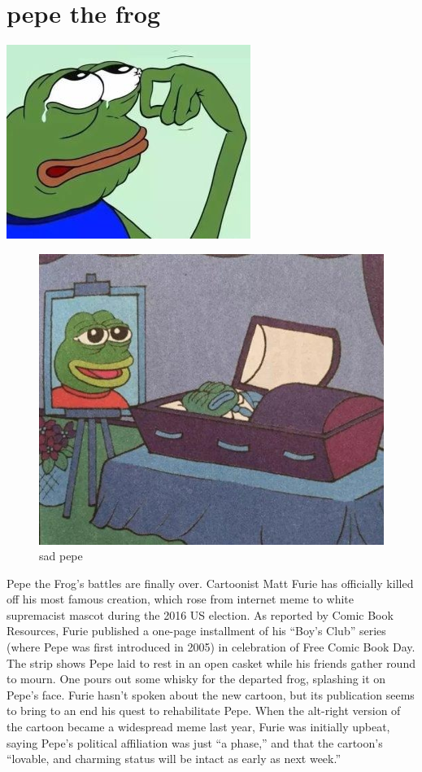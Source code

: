 
\section{pepe the frog}
\includegraphics [width=.9  \textwidth] {image/frog.jpg}
\begin{figure}
\begin{center}
\includegraphics  [width=0.5  \textwidth] {image/frog2.jpg} %
\end{center}
\caption{sad pepe}
\label{figure zzzz}
\end{figure}
Pepe the Frog’s battles are finally over. Cartoonist Matt Furie has officially killed off his most famous creation, which rose from internet meme to white supremacist mascot during the 2016 US election. As reported by Comic Book Resources, Furie published a one-page installment of his “Boy’s Club” series (where Pepe was first introduced in 2005) in celebration of Free Comic Book Day. The strip shows Pepe laid to rest in an open casket while his friends gather round to mourn. One pours out some whisky for the departed frog, splashing it on Pepe’s face. 
Furie hasn’t spoken about the new cartoon, but its publication seems to bring to an end his quest to rehabilitate Pepe. When the alt-right version of the cartoon became a widespread meme last year, Furie was initially upbeat, saying Pepe’s political affiliation was just “a phase,” and that the cartoon’s “lovable, and charming status will be intact as early as next week.” 
